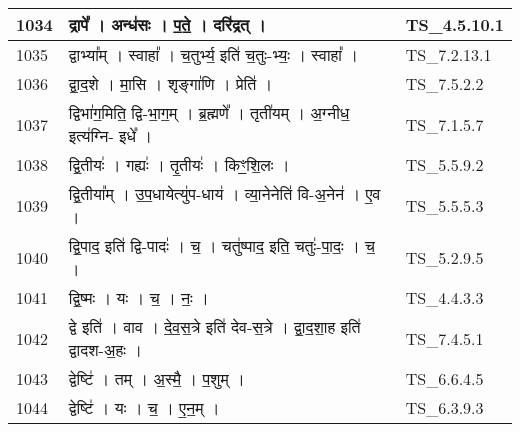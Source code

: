 \documentclass[17pt]{extarticle}
\begin{document}
\begin{longtable}{||p{0.4in}||p{4.9in}||p{0.9in}||}
    1034 & द्रापे᳚   ।   अन्ध॑सः   ।   प॒ते॒   ।   दरि॑द्रत्   ।    & TS\_4.5.10.1       \\
    
    \hline
        
    1035 & द्वाभ्या᳚म्   ।   स्वाहा᳚   ।   च॒तुर्भ्य॒ इति॑ च॒तुः{-}भ्यः॒   ।   स्वाहा᳚   ।    & TS\_7.2.13.1       \\
    
    \hline
        
    1036 & द्वा॒द॒शे   ।   मा॒सि   ।   शृङ्गा॑णि   ।   प्रेति॑   ।    & TS\_7.5.2.2       \\
    
    \hline
        
    1037 & द्विभा॑ग॒मिति॒ द्वि{-}भा॒ग॒म्   ।   ब्र॒ह्मणे᳚   ।   तृती॑यम्   ।   अ॒ग्नीध॒ इत्य॑ग्नि{-} इधे᳚   ।    & TS\_7.1.5.7       \\
    
    \hline
        
    1038 & द्वि॒तीयः॑   ।   गह्यः॑   ।   तृ॒तीयः॑   ।   किꣳ॒॒शि॒लः   ।    & TS\_5.5.9.2       \\
    
    \hline
        
    1039 & द्वि॒तीया᳚म्   ।   उ॒प॒धायेत्यु॑प{-}धाय॑   ।   व्या॒नेनेति॑ वि{-}अ॒नेन॑   ।   ए॒व   ।    & TS\_5.5.5.3       \\
    
    \hline
        
    1040 & द्वि॒पाद॒ इति॑ द्वि{-}पादः॑   ।   च॒   ।   चतु॑ष्पाद॒ इति॒ चतुः॑{-}पा॒दः॒   ।   च॒   ।    & TS\_5.2.9.5       \\
    
    \hline
        
    1041 & द्वि॒ष्मः   ।   यः   ।   च॒   ।   नः॒   ।    & TS\_4.4.3.3       \\
    
    \hline
        
    1042 & द्वे इति॑   ।   वाव   ।   दे॒व॒स॒त्रे इति॑ देव{-}स॒त्रे   ।   द्वा॒द॒शा॒ह इति॑ द्वादश{-}अ॒हः   ।    & TS\_7.4.5.1       \\
    
    \hline
        
    1043 & द्वेष्टि॑   ।   तम्   ।   अ॒स्मै॒   ।   प॒शुम्   ।    & TS\_6.6.4.5       \\
    
    \hline
        
    1044 & द्वेष्टि॑   ।   यः   ।   च॒   ।   ए॒न॒म्   ।    & TS\_6.3.9.3       \\
    

\end{longtable}
\end{document}
